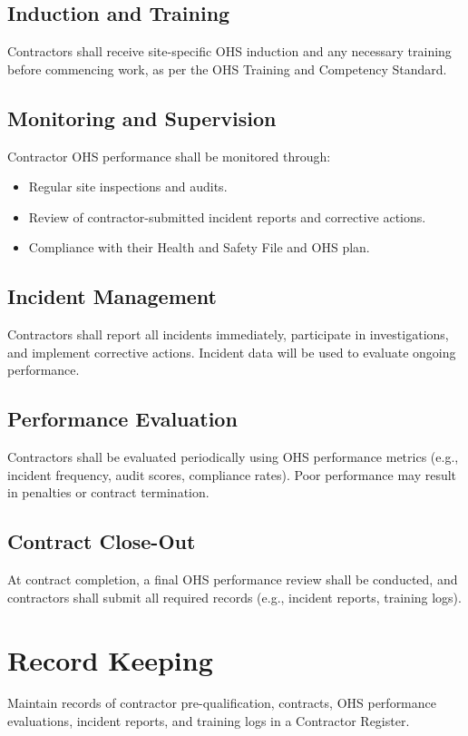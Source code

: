 \documentclass[11pt]{article}
\begin{document}
\subsection{Induction and Training}
Contractors shall receive site-specific OHS induction and any necessary training before commencing work, as per the OHS Training and Competency Standard.

\subsection{Monitoring and Supervision}
Contractor OHS performance shall be monitored through:
\begin{itemize}
    \item Regular site inspections and audits.
    \item Review of contractor-submitted incident reports and corrective actions.
    \item Compliance with their Health and Safety File and OHS plan.
\end{itemize}

\subsection{Incident Management}
Contractors shall report all incidents immediately, participate in investigations, and implement corrective actions. Incident data will be used to evaluate ongoing performance.

\subsection{Performance Evaluation}
Contractors shall be evaluated periodically using OHS performance metrics (e.g., incident frequency, audit scores, compliance rates). Poor performance may result in penalties or contract termination.

\subsection{Contract Close-Out}
At contract completion, a final OHS performance review shall be conducted, and contractors shall submit all required records (e.g., incident reports, training logs).

\section{Record Keeping}
Maintain records of contractor pre-qualification, contracts, OHS performance evaluations, incident reports, and training logs in a Contractor Register.
\end{document}
